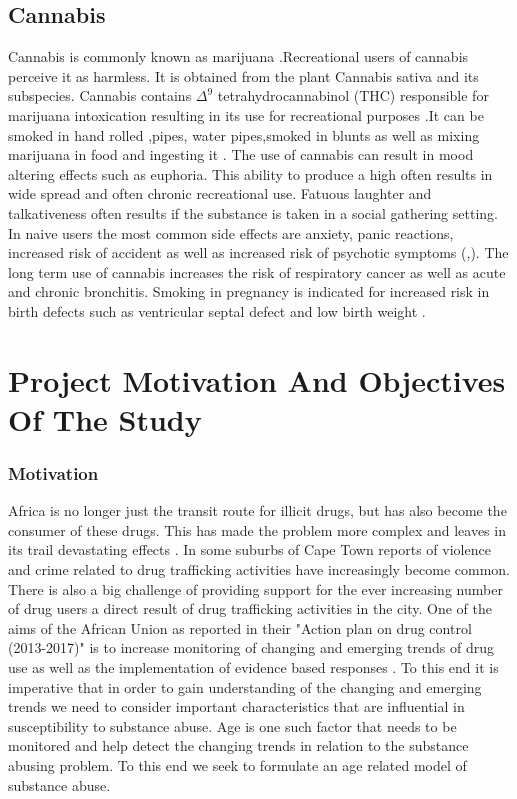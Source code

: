 \subsection{Cannabis}
Cannabis is commonly known as marijuana \cite{hall1998adverse}.Recreational users of cannabis perceive it as harmless. It is obtained from the plant Cannabis sativa and its subspecies. Cannabis contains $\Delta^9$ tetrahydrocannabinol (THC) responsible for marijuana intoxication resulting in its use for recreational purposes \cite{ashton1999adverse}.It can be smoked in hand rolled ,pipes, water pipes,smoked in blunts as well as mixing marijuana in food and ingesting it \cite{nidamarijuana}. The use of cannabis can result in mood altering effects such as euphoria. This ability to produce a high often results in wide spread and often chronic recreational use. Fatuous laughter and talkativeness often results if the substance is taken in a social gathering setting. In naive users the  most common side effects are anxiety, panic reactions, increased risk of accident as well as increased risk of psychotic symptoms (\cite{hall1998adverse},\cite{ashton1999adverse}). The long term use of cannabis increases the risk of respiratory cancer as well as acute and chronic bronchitis. Smoking in pregnancy is indicated for increased risk in birth defects such as ventricular septal defect and low birth weight \cite{csam}.

\section{Project Motivation And Objectives Of The Study}
\subsubsection{Motivation}
 Africa is no longer just the transit route for illicit drugs, but has also become the consumer of these drugs. This has made the problem more complex and leaves in its trail devastating effects \cite{au}. In some suburbs of Cape Town reports of violence and crime related to drug trafficking activities have increasingly become common. There is also a big challenge of providing support for the ever increasing number of drug users a direct result of drug trafficking activities in the city. One of the aims of the African Union as reported in their "Action plan on drug control (2013-2017)" is to increase monitoring of changing and emerging trends of drug use  as well as the implementation of evidence based responses \cite{au1}. To this end it is imperative that in order to gain understanding of the changing and emerging trends we need to consider important  characteristics that are influential in susceptibility to substance abuse. Age is one such factor that needs to be monitored and help detect the changing trends in relation to the substance abusing problem. To this end we seek to formulate an age related model of substance abuse.
